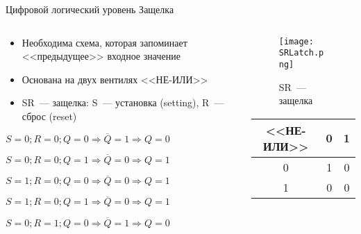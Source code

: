 \documentclass[aspectratio=169,14pt]{beamer}
\begin{document}
\begin{frame}{Цифровой логический уровень}
    Защелка
    \begin{columns}[T,onlytextwidth]
        \begin{column}{0.5\textwidth}
            \begin{footnotesize}
                \begin{itemize}
                \item Необходима схема, которая запоминает <<предыдущее>> входное значение
                \item Основана на двух вентилях <<НЕ-ИЛИ>>
                \item SR~--- защелка: S~--- установка (setting), R~--- сброс (reset)
            \end{itemize}
            $S=0; R=0; Q=0 \Rightarrow \overline{Q} = 1 \Rightarrow Q=0$

            $S=0; R=0; Q=1 \Rightarrow \overline{Q} = 0 \Rightarrow Q=1$

            $S=1; R=0; Q=0 \Rightarrow \overline{Q} = 0 \Rightarrow Q=1$

            $S=1; R=0; Q=1 \Rightarrow \overline{Q} = 0 \Rightarrow Q=1$

            $S=0; R=1; Q=0 \Rightarrow \overline{Q} = 1 \Rightarrow Q=0$

        \end{footnotesize}
        \end{column}
        \begin{column}{0.5\textwidth}
            \begin{figure}[htp]
                \centering
                \texttt{[image: SRLatch.png]}
                \caption{\tiny{SR~--- защелка}}
            \end{figure}
            \begin{table}
                \centering
                \begin{footnotesize}
                \begin{tabular}{c|cc}
                    \textbf{<<НЕ-ИЛИ>>} & 0 & 1 \\ \hline
                    0 & 1 & 0 \\
                    1 & 0 & 0
                \end{tabular}
                \end{footnotesize}
            \end{table}
        \end{column}
    \end{columns}
\end{frame}
\end{document}
